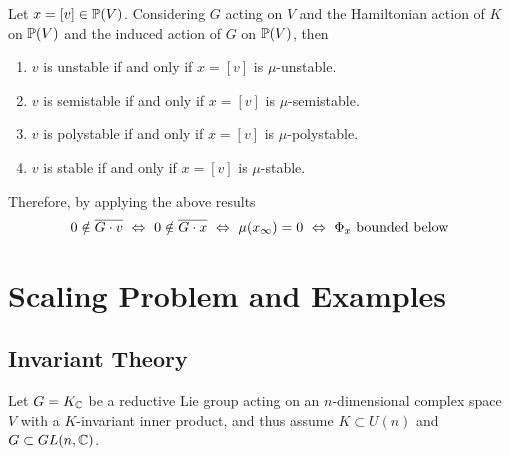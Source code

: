 \documentclass[a4paper,12pt]{article}
\newcommand{\sectionbreak}{\clearpage}
\begin{document}
	\begin{thm}
		Let $x = [v] \in \mathbb{P}(V)$. Considering $G$ acting on $V$ and the Hamiltonian action of $K$ on $\mathbb{P}(V)$ and the induced action of $G$ on $\mathbb{P}(V)$, then
		\begin{enumerate}
			\item $v$ is unstable if and only if $x = [v]$ is $\mu$-unstable.
			\item $v$ is semistable if and only if $x=[v]$ is $\mu$-semistable.
			\item $v$ is polystable if and only if $x=[v]$ is $\mu$-polystable.
			\item $v$ is stable if and only if $x=[v]$ is $\mu$-stable.
		\end{enumerate}
	\end{thm}
	\begin{rem}
		Therefore, by applying the above results
		\begin{equation*}
			0 \notin \overline{G \cdot v} ~\Leftrightarrow~ 0 \notin \overline{G \cdot x} ~\Leftrightarrow~\mu(x_{\infty}) = 0 ~\Leftrightarrow~ \Phi_{x} \text{ bounded below} 
		\end{equation*}
	\end{rem}
	
	\sectionbreak
	\section{Scaling Problem and Examples}

	\subsection{Invariant Theory}

	Let $G=K_{\mathbb{C}}$ be a reductive Lie group acting on an $n$-dimensional complex space $V$ with a $K$-invariant inner product, and thus assume $K \subset U(n)$ and $G \subset GL(n,\mathbb{C})$.
	
\end{document}
